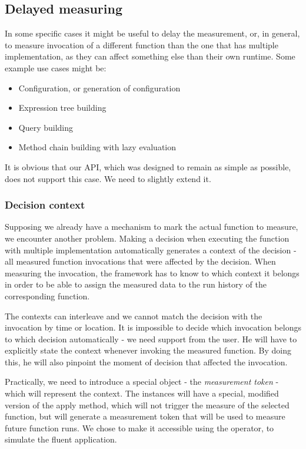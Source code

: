 
\subsection{Delayed measuring}
\label{subsec:delayed_measuring}

In some specific cases it might be useful to delay the measurement, or, in general, to measure invocation of a different function than the one that has multiple implementation, as they can affect something else than their own runtime. Some example use cases might be:

\begin{itemize}
	\item Configuration, or generation of configuration
	\item Expression tree building
	\item Query building
	\item Method chain building with lazy evaluation
\end{itemize}

It is obvious that our API, which was designed to remain as simple as possible, does not support this case. We need to slightly extend it.

\subsubsection{Decision context}

Supposing we already have a mechanism to mark the actual function to measure, we encounter another problem. Making a decision when executing the function with multiple implementation automatically generates a context of the decision - all measured function invocations that were affected by the decision. When measuring the invocation, the framework has to know to which context it belongs in order to be able to assign the measured data to the run history of the corresponding function.

The contexts can interleave and we cannot match the decision with the invocation by time or location. It is impossible to decide which invocation belongs to which decision automatically - we need support from the user. He will have to explicitly state the context whenever invoking the measured function. By doing this, he will also pinpoint the moment of decision that affected the invocation.

Practically, we need to introduce a special object - the \textit{measurement token} - which will represent the context. The  instances will have a special, modified version of the apply method, which will not trigger the measure of the selected function, but will generate a measurement token that will be used to measure future function runs. We chose to make it accessible using the \inlinecode{\textasciicircum()} operator, to simulate the fluent application.

